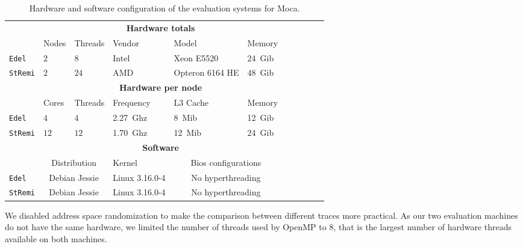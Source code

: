 \begin{table}[htb]
    \centering
    \begin{tabular}{lllllllllll}
        \toprule
        & \multicolumn{5}{c}{\textbf{Hardware totals}}\\
        \cmidrule(lr){2-6}
        & Nodes & Threads & Vendor & Model & Memory \\
        \cmidrule(lr){2-6}
        \texttt{Edel}    & $2$ & $8$  & Intel & Xeon E5520      & \SI{24}{Gib} \\
        \texttt{StRemi} & $2$ & $24$ & AMD   & Opteron 6164 HE & \SI{48}{Gib} \\
        \midrule
        & \multicolumn{5}{c}{\textbf{Hardware per node}}\\
        \cmidrule(lr){2-6}
        & Cores & Threads & Frequency & L3 Cache & Memory \\
        \cmidrule(lr){2-6}
        \texttt{Edel}   & $4$  & $4$   & \SI{2.27}{Ghz}& \SI{8}{Mib}  & \SI{12}{Gib} \\
        \texttt{StRemi} & $12$ & $12$  & \SI{1.70}{Ghz}& \SI{12}{Mib} & \SI{24}{Gib}\\
        \midrule
        & \multicolumn{5}{c}{\textbf{Software}}\\
        \cmidrule(lr){2-6}
        & \multicolumn{2}{c}{Distribution} & Kernel &
            \multicolumn{2}{c}{Bios configurations} \\
        \cmidrule(lr){2-6}
        \texttt{Edel}   & \multicolumn{2}{c}{Debian Jessie} & Linux 3.16.0-4 &
            \multicolumn{2}{c}{No hyperthreading} \\
        \texttt{StRemi} & \multicolumn{2}{c}{Debian Jessie} & Linux 3.16.0-4 &
            \multicolumn{2}{c}{No hyperthreading}\\
        \bottomrule
    \end{tabular}
    \caption{Hardware and software configuration of the evaluation systems for Moca.}
    \label{tab:hw-moca}
\end{table}

We disabled address space randomization to make the comparison between different traces more practical.
As our two evaluation machines do not have the same hardware, we limited the number of threads used by \gls{OpenMP} to $8$, that is the largest number of hardware threads available on both machines.

